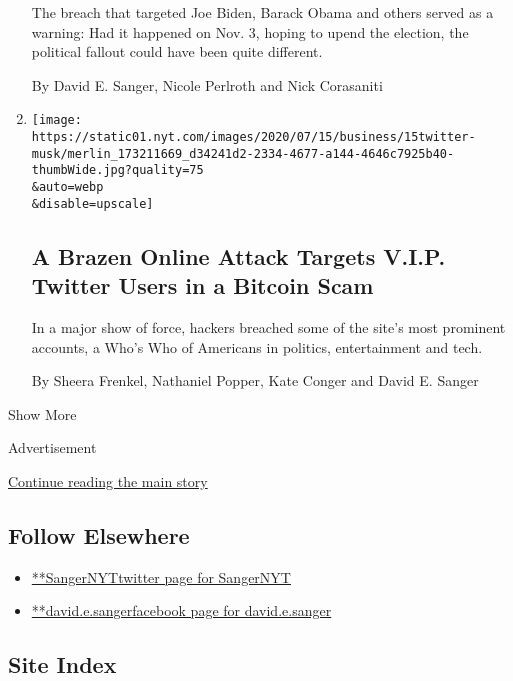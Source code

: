 \begin{enumerate}
  The breach that targeted Joe Biden, Barack Obama and others served as
  a warning: Had it happened on Nov. 3, hoping to upend the election,
  the political fallout could have been quite different.

  By David E. Sanger, Nicole Perlroth and Nick Corasaniti
\item
  \href{/2020/07/15/technology/twitter-hack-bill-gates-elon-musk.html}{}

  \texttt{[image: https://static01.nyt.com/images/2020/07/15/business/15twitter-musk/merlin\_173211669\_d34241d2-2334-4677-a144-4646c7925b40-thumbWide.jpg?quality=75\\\&auto=webp\\\&disable=upscale]}

  \hypertarget{a-brazen-online-attack-targets-vip-twitter-users-in-a-bitcoin-scam}{%
  \subsection{A Brazen Online Attack Targets V.I.P. Twitter Users in a
  Bitcoin
  Scam}\label{a-brazen-online-attack-targets-vip-twitter-users-in-a-bitcoin-scam}}

  In a major show of force, hackers breached some of the site's most
  prominent accounts, a Who's Who of Americans in politics,
  entertainment and tech.

  By Sheera Frenkel, Nathaniel Popper, Kate Conger and David E. Sanger
\end{enumerate}

Show More

Advertisement

\protect\hyperlink{after-mid2}{Continue reading the main story}

\hypertarget{follow-elsewhere}{%
\subsection{Follow Elsewhere}\label{follow-elsewhere}}

\begin{itemize}
\tightlist
\item
  \href{https://twitter.com/SangerNYT}{**SangerNYTtwitter page for
  SangerNYT}
\item
  \href{https://www.facebook.com/david.e.sanger}{**david.e.sangerfacebook
  page for david.e.sanger}
\end{itemize}

\hypertarget{site-index}{%
\subsection{Site Index}\label{site-index}}

